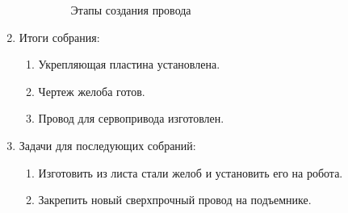 \begin{enumerate}
\begin{enumerate}
\begin{figure}[H]
\begin{minipage}[h]{0.24\linewidth}
	  	  \end{minipage}
	  	  \caption{Этапы создания провода}
	   \end{figure}

	\end{enumerate}
	
	\item Итоги собрания:
	\begin{enumerate}
		
	  \item Укрепляющая пластина установлена.
		
  	  \item Чертеж желоба готов.
		
      \item Провод для сервопривода изготовлен.
		
	\end{enumerate}
	
	\item Задачи для последующих собраний:
	\begin{enumerate}
		
	  \item Изготовить из листа стали желоб и установить его на робота.
		
	  \item Закрепить новый сверхпрочный провод на подъемнике.
			
	\end{enumerate}
\end{enumerate}
\fillpage
